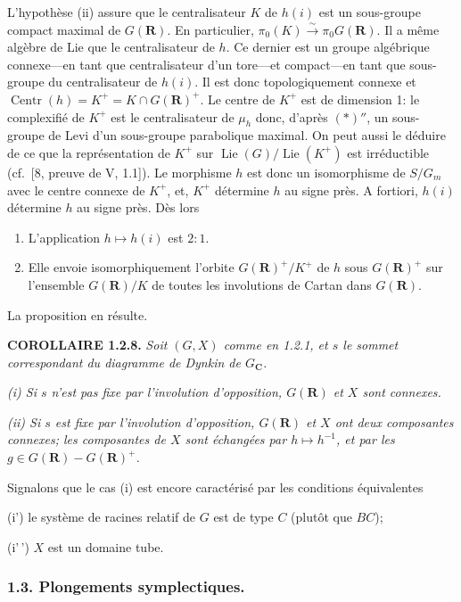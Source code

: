 \documentclass[10pt,a4paper]{article}
\begin{document}
L'hypothèse (ii) assure que le centralisateur \(K\) de \(h(i)\) est un sous-groupe compact maximal de \(G(\mathbf R)\). En particulier, \(\pi_0(K)\xrightarrow{\sim}\pi_0G(\mathbf R)\). Il a même algèbre de Lie que le centralisateur de \(h\). Ce dernier est un groupe algébrique connexe---en tant que centralisateur d'un tore---et compact---en tant que sous-groupe du centralisateur de \(h(i)\). Il est donc topologiquement connexe et \(\operatorname{Centr}(h)=K^+=K\cap G(\mathbf R)^+\). Le centre de \(K^+\) est de dimension 1: le complexifié de \(K^+\) est le centralisateur de \(\mu_h\) donc, d'après \((*)''\), un sous-groupe de Levi d'un sous-groupe parabolique maximal. On peut aussi le déduire de ce que la représentation de \(K^+\) sur \(\operatorname{Lie}(G)/\operatorname{Lie}(K^+)\) est irréductible (cf.~{[}8, preuve de V, 1.1{]}). Le morphisme \(h\) est donc un isomorphisme de \(S/G_m\) avec le centre connexe de \(K^+\), et, \(K^+\) détermine \(h\) au signe près. A fortiori, \(h(i)\) détermine \(h\) au signe près. Dès lors

\begin{enumerate}
\def\labelenumi{(\alph{enumi})}
\item
  L'application \(h\mapsto h(i)\) est \(2:1\).
\item
  Elle envoie isomorphiquement l'orbite \(G(\mathbf R)^+/K^+\) de \(h\) sous \(G(\mathbf R)^+\) sur l'ensemble \(G(\mathbf R)/K\) de toutes les involutions de Cartan dans \(G(\mathbf R)\).
\end{enumerate}

La proposition en résulte.

\textbf{COROLLAIRE 1.2.8.} \emph{Soit \((G,X)\) comme en 1.2.1, et \(s\) le sommet correspondant du diagramme de Dynkin de \(G_{\mathbf C}\).}

\emph{(i) Si \(s\) n'est pas fixe par l'involution d'opposition, \(G(\mathbf R)\) et \(X\) sont connexes.}

\emph{(ii) Si \(s\) est fixe par l'involution d'opposition, \(G(\mathbf R)\) et \(X\) ont deux composantes connexes; les composantes de \(X\) sont échangées par \(h\mapsto h^{-1}\), et par les \(g\in G(\mathbf R)-G(\mathbf R)^+\).}

Signalons que le cas (i) est encore caractérisé par les conditions équivalentes

(i') le système de racines relatif de \(G\) est de type \(C\) (plutôt que \(BC\));

(i'\,') \(X\) est un domaine tube.

\subsubsection{1.3. Plongements symplectiques.}
\end{document}
